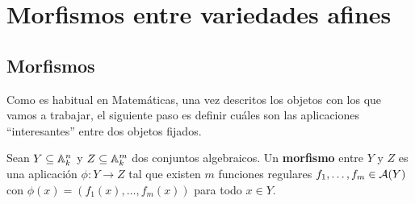 \documentclass[ACGA.tex]{subfiles}
\begin{document}
%
%
%
%
%
%
%
%
%
%
%
%

\chapter{Morfismos entre variedades afines}

\section{Morfismos}

Como es habitual en Matemáticas, una vez descritos los objetos con los que vamos a trabajar, el siguiente paso es definir cuáles son las aplicaciones ``interesantes'' entre dos objetos fijados. 

\begin{defi}
 Sean $Y\subseteq\mathbb{A}^n_k$ y $Z\subseteq\mathbb{A}^m_k$ dos conjuntos algebraicos. Un {\bf morfismo} entre $Y$ y $Z$ es una aplicación $\phi:Y\to Z$ tal que existen $m$ funciones regulares $f_1,\ldots,f_m\in \mathcal{A}(Y)$ con $\phi(x)=(f_1(x),\ldots,f_m(x))$ para todo $x\in Y$.
\end{defi}
\end{document}
